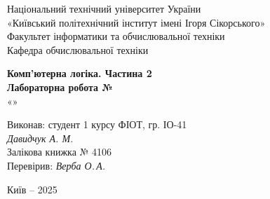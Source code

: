 \documentclass[12pt,a4paper]{article}
\begin{document}
    \begin{titlepage}

        \thispagestyle{empty}
        \begin{center}
        \large
        Національний технічний університет України\\
        «Київський політехнічний інститут імені Ігоря Сікорського»\\[1em]
        Факультет інформатики та обчислювальної техніки\\
        Кафедра обчислювальної техніки
        \end{center}

        \vfill

        \begin{center}
        \textbf{\Large Комп'ютерна логіка. Частина 2}\\[2em]
        \textbf{\Large Лабораторна робота №}\\
        «» 
        \end{center}

        \vfill

        \begin{flushright}
        Виконав: студент 1 курсу ФІОТ, гр. ІО-41\\
        \textit{Давидчук А. М.}\\
        Залікова книжка № 4106\\[1em]
        Перевірив: \textit{Верба О.\,А.}
        \end{flushright}

        \vfill

        \begin{center}
        Київ -- 2025
        \end{center}

    \end{titlepage}

\end{document}
